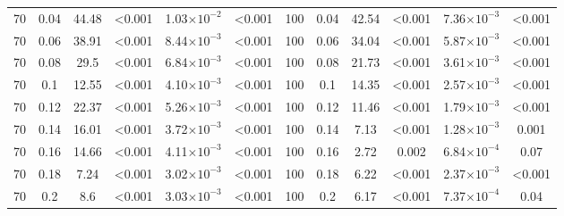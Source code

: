 \documentclass[12pt]{article}
\begin{document}
\begin{spacing}{2.0}
\begin{table}[hb!]
\begin{tabular}{c c | c c| c c ||c c | c c | c c |}
                70  & 0.04  & 44.48 & \textless0.001 & 1.03$\times10^{-2}$ & \textless0.001 & 100 & 0.04  & 42.54 & \textless0.001 & 7.36$\times10^{-3}$ & \textless0.001 \\
                70  & 0.06  & 38.91 & \textless0.001 & 8.44$\times10^{-3}$ & \textless0.001 & 100 & 0.06  & 34.04 & \textless0.001 & 5.87$\times10^{-3}$ & \textless0.001 \\
                70  & 0.08  & 29.5  & \textless0.001 & 6.84$\times10^{-3}$ & \textless0.001 & 100 & 0.08  & 21.73 & \textless0.001 & 3.61$\times10^{-3}$ & \textless0.001 \\
                70  & 0.1 & 12.55 & \textless0.001 & 4.10$\times10^{-3}$ & \textless0.001 & 100 & 0.1 & 14.35 & \textless0.001 & 2.57$\times10^{-3}$ & \textless0.001 \\
                70  & 0.12  & 22.37 & \textless0.001 & 5.26$\times10^{-3}$ & \textless0.001 & 100 & 0.12  & 11.46 & \textless0.001 & 1.79$\times10^{-3}$ & \textless0.001 \\
                70  & 0.14  & 16.01 & \textless0.001 & 3.72$\times10^{-3}$ & \textless0.001 & 100 & 0.14  & 7.13  & \textless0.001 & 1.28$\times10^{-3}$ & 0.001  \\
                70  & 0.16  & 14.66 & \textless0.001 & 4.11$\times10^{-3}$ & \textless0.001 & 100 & 0.16  & 2.72  & 0.002  & 6.84$\times10^{-4}$ & 0.07 \\
                70  & 0.18  & 7.24  & \textless0.001 & 3.02$\times10^{-3}$ & \textless0.001 & 100 & 0.18  & 6.22  & \textless0.001 & 2.37$\times10^{-3}$ & \textless0.001 \\
                70  & 0.2 & 8.6 & \textless0.001 & 3.03$\times10^{-3}$ & \textless0.001 & 100 & 0.2 & 6.17  & \textless0.001 & 7.37$\times10^{-4}$ & 0.04 \\
        \hline
	    \end{tabular}
	    \end{table}


\end{spacing}
\end{document}
